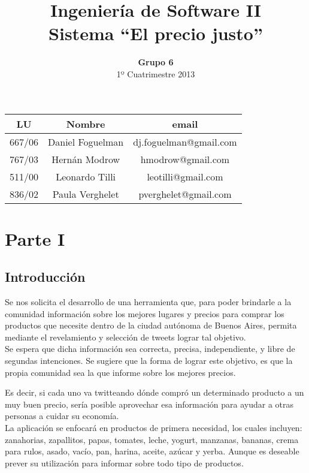 \documentclass[a4paper,8pt]{article}
\title{Ingeniería de Software II\\ \textbf{Sistema ``El precio justo''}}
\author{\textbf{Grupo 6}\\ 1º Cuatrimestre 2013}
\date{}
\begin{document}
\maketitle
\vspace{10cm}
\begin{center}

\begin{tabular}{|c|c|c|}
\hline
\hline
\textbf{LU}&\textbf{Nombre}&\textbf{email}\\
\hline
667/06&Daniel Foguelman &dj.foguelman@gmail.com\\
\hline
767/03&Hernán Modrow&hmodrow@gmail.com\\
\hline
511/00&Leonardo Tilli&leotilli@gmail.com\\
\hline
836/02&Paula Verghelet&pverghelet@gmail.com\\
\hline
\hline
\end{tabular}
\end{center}
\newpage

\section{Parte I}
\subsection{Introducción}
Se nos solicita el desarrollo de una herramienta que, para poder brindarle a la comunidad información sobre los mejores lugares y precios para comprar los productos que necesite dentro de la ciudad autónoma de Buenos Aires, permita mediante el revelamiento y selección de tweets lograr tal objetivo. \\

Se espera que dicha información sea correcta, precisa, independiente, y libre de segundas intenciones. Se sugiere que la forma de lograr este objetivo, es que la propia comunidad sea la que informe sobre los mejores precios.

Es decir, si cada uno va twitteando dónde compró un determinado producto a un muy
buen precio, sería posible aprovechar esa información para ayudar a otras personas a cuidar su economía.\\

La aplicación se enfocará en productos de primera necesidad, los cuales incluyen: zanahorias, zapallitos, papas, tomates, leche, yogurt,
manzanas, bananas, crema para rulos, asado, vacío, pan, harina, aceite, azúcar y yerba. Aunque es deseable prever su utilización para informar sobre todo tipo de productos. \\
\end{document}
